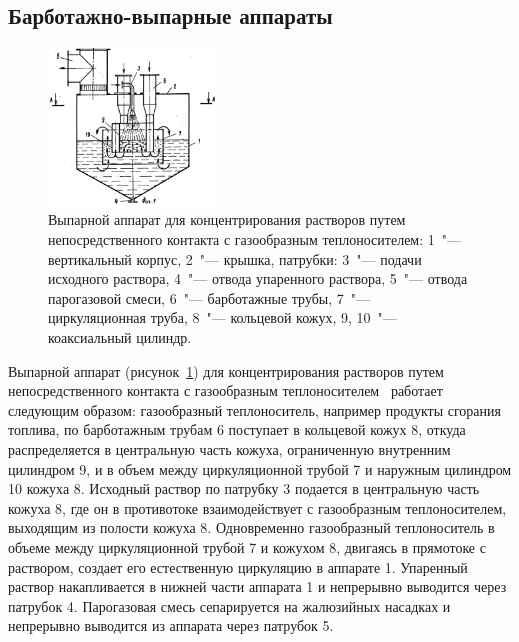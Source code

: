 \subsection{Барботажно-выпарные аппараты}
\begin{figure}
\centering
\includegraphics[width=0.4\textwidth]{figures/temp/rabiner.jpg}
\caption[Выпарной аппарат для концентрирования растворов путем непосредственного контакта с газообразным теплоносителем]{Выпарной аппарат для концентрирования растворов путем непосредственного контакта с газообразным теплоносителем: 1~"--- вертикальный корпус, 2~"--- крышка, патрубки: 3~"--- подачи исходного раствора, 4~"--- отвода упаренного раствора, 5~"--- отвода парогазовой смеси, 6~"--- барботажные трубы, 7~"--- циркуляционная труба, 8~"--- кольцевой кожух, 9, 10~"--- коаксиальный цилиндр.}\label{fig:evaporation_app_rabiner}
\end{figure}
Выпарной аппарат (рисунок~\ref{fig:evaporation_app_rabiner}) для концентрирования растворов путем непосредственного контакта с газообразным теплоносителем~\cite{Rabiner.Vypanroy.1979} работает следующим образом: газообразный теплоноситель, например продукты сгорания топлива, по барботажным трубам 6 поступает в кольцевой кожух 8, откуда распределяется в центральную часть кожуха, ограниченную внутренним цилиндром 9, и в объем между циркуляционной трубой 7 и наружным цилиндром 10 кожуха 8.
Исходный раствор по патрубку 3 подается в центральную часть кожуха 8, где он в противотоке взаимодействует с газообразным теплоносителем, выходящим из полости кожуха 8.
Одновременно газообразный теплоноситель в объеме между циркуляционной трубой 7 и кожухом 8, двигаясь в прямотоке с раствором, создает его естественную циркуляцию в аппарате 1.
Упаренный раствор накапливается в нижней части аппарата 1 и непрерывно выводится через патрубок 4.
Парогазовая смесь сепарируется на жалюзийных насадках и непрерывно выводится из аппарата через патрубок 5.

